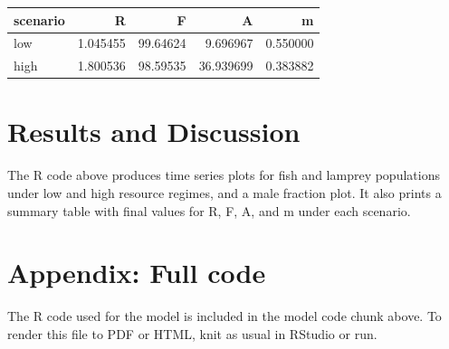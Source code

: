 \documentclass[
]{article}
\begin{document}
\begin{longtable}[]{@{}lrrrr@{}}
\toprule\noalign{}
scenario & R & F & A & m \\
\midrule\noalign{}
\endhead
\bottomrule\noalign{}
\endlastfoot
low & 1.045455 & 99.64624 & 9.696967 & 0.550000 \\
high & 1.800536 & 98.59535 & 36.939699 & 0.383882 \\
\end{longtable}

\section{Results and Discussion}\label{results-and-discussion}

The R code above produces time series plots for fish and lamprey
populations under low and high resource regimes, and a male fraction
plot. It also prints a summary table with final values for R, F, A, and
m under each scenario.

\section{Appendix: Full code}\label{appendix-full-code}

The R code used for the model is included in the model code chunk above.
To render this file to PDF or HTML, knit as usual in RStudio or run.
\end{document}
